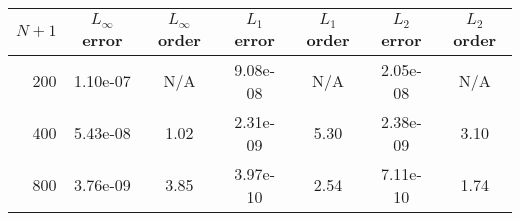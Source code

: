 \begin{tabular}{rcccccc}
    \toprule
    $N+1$ & $L_{\infty}$ error & $L_{\infty}$ order & $L_1$ error & $L_1$ order & $L_2$ error & $L_2$ order \\
    \midrule
      200 & 1.10e-07 &   N/A & 9.08e-08 &   N/A & 2.05e-08 &   N/A \\
      400 & 5.43e-08 &  1.02 & 2.31e-09 &  5.30 & 2.38e-09 &  3.10 \\
      800 & 3.76e-09 &  3.85 & 3.97e-10 &  2.54 & 7.11e-10 &  1.74 \\
    \bottomrule
\end{tabular}